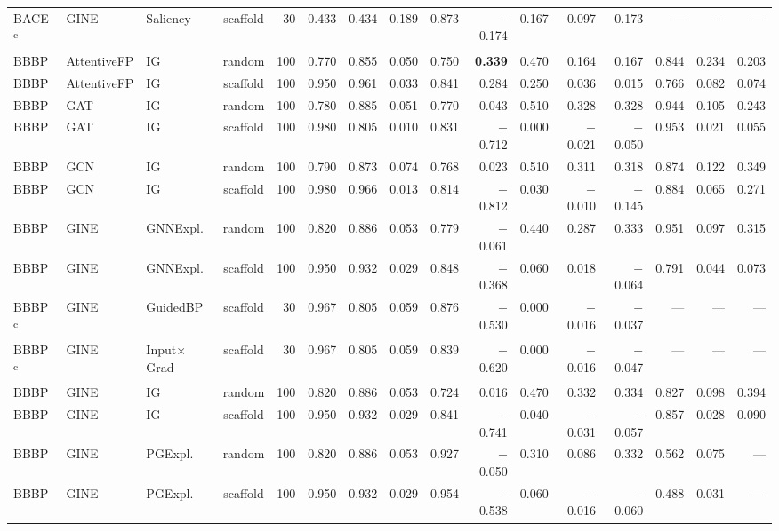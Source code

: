 \begin{table}
{\begin{tabular}{lllcrrrrrrrrrrrr}
BACE\,\textsuperscript{c} & GINE & Saliency & scaffold & 30 & 0.433 & 0.434 & 0.189 & 0.873 & $-$0.174 & 0.167 & 0.097 & 0.173 & --- & --- & --- \\
\addlinespace[2pt]
BBBP & AttentiveFP & IG & random & 100 & 0.770 & 0.855 & 0.050 & 0.750 & \textbf{0.339} & 0.470 & 0.164 & 0.167 & 0.844 & 0.234 & 0.203 \\
BBBP & AttentiveFP & IG & scaffold & 100 & 0.950 & 0.961 & 0.033 & 0.841 & 0.284 & 0.250 & 0.036 & 0.015 & 0.766 & 0.082 & 0.074 \\
BBBP & GAT & IG & random & 100 & 0.780 & 0.885 & 0.051 & 0.770 & 0.043 & 0.510 & 0.328 & 0.328 & 0.944 & 0.105 & 0.243 \\
BBBP & GAT & IG & scaffold & 100 & 0.980 & 0.805 & 0.010 & 0.831 & $-$0.712 & 0.000 & $-$0.021 & $-$0.050 & 0.953 & 0.021 & 0.055 \\
BBBP & GCN & IG & random & 100 & 0.790 & 0.873 & 0.074 & 0.768 & 0.023 & 0.510 & 0.311 & 0.318 & 0.874 & 0.122 & 0.349 \\
BBBP & GCN & IG & scaffold & 100 & 0.980 & 0.966 & 0.013 & 0.814 & $-$0.812 & 0.030 & $-$0.010 & $-$0.145 & 0.884 & 0.065 & 0.271 \\
BBBP & GINE & GNNExpl. & random & 100 & 0.820 & 0.886 & 0.053 & 0.779 & $-$0.061 & 0.440 & 0.287 & 0.333 & 0.951 & 0.097 & 0.315 \\
BBBP & GINE & GNNExpl. & scaffold & 100 & 0.950 & 0.932 & 0.029 & 0.848 & $-$0.368 & 0.060 & 0.018 & $-$0.064 & 0.791 & 0.044 & 0.073 \\
BBBP\,\textsuperscript{c} & GINE & GuidedBP & scaffold & 30 & 0.967 & 0.805 & 0.059 & 0.876 & $-$0.530 & 0.000 & $-$0.016 & $-$0.037 & --- & --- & --- \\
BBBP\,\textsuperscript{c} & GINE & Input$\times$Grad & scaffold & 30 & 0.967 & 0.805 & 0.059 & 0.839 & $-$0.620 & 0.000 & $-$0.016 & $-$0.047 & --- & --- & --- \\
BBBP & GINE & IG & random & 100 & 0.820 & 0.886 & 0.053 & 0.724 & 0.016 & 0.470 & 0.332 & 0.334 & 0.827 & 0.098 & 0.394 \\
BBBP & GINE & IG & scaffold & 100 & 0.950 & 0.932 & 0.029 & 0.841 & $-$0.741 & 0.040 & $-$0.031 & $-$0.057 & 0.857 & 0.028 & 0.090 \\
BBBP & GINE & PGExpl. & random & 100 & 0.820 & 0.886 & 0.053 & 0.927 & $-$0.050 & 0.310 & 0.086 & 0.332 & 0.562 & 0.075 & --- \\
BBBP & GINE & PGExpl. & scaffold & 100 & 0.950 & 0.932 & 0.029 & 0.954 & $-$0.538 & 0.060 & $-$0.016 & $-$0.060 & 0.488 & 0.031 & --- \\

\end{tabular}}
\end{table}
